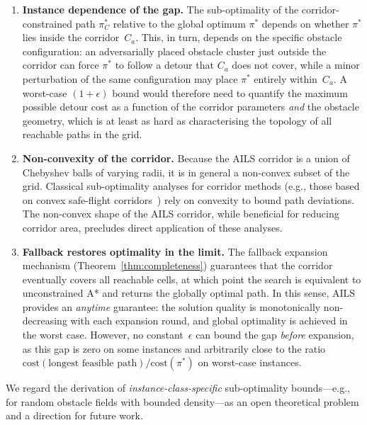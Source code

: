 \documentclass[journal]{IEEEtran}
\begin{document}
\begin{enumerate}
    \item \textbf{Instance dependence of the gap.}
    The sub-optimality of the corridor-constrained path $\pi^{*}_{C}$ relative to the global optimum $\pi^{*}$ depends on whether $\pi^{*}$ lies inside the corridor~$C_a$.
    This, in turn, depends on the specific obstacle configuration: an adversarially placed obstacle cluster just outside the corridor can force $\pi^{*}$ to follow a detour that $C_a$ does not cover, while a minor perturbation of the same configuration may place $\pi^{*}$ entirely within~$C_a$.
    A worst-case $(1{+}\epsilon)$ bound would therefore need to quantify the maximum possible detour cost as a function of the corridor parameters \emph{and} the obstacle geometry, which is at least as hard as characterising the topology of all reachable paths in the grid.

    \item \textbf{Non-convexity of the corridor.}
    Because the AILS corridor is a union of Chebyshev balls of varying radii, it is in general a non-convex subset of the grid.
    Classical sub-optimality analyses for corridor methods (e.g., those based on convex safe-flight corridors~\cite{chen2024bubble}) rely on convexity to bound path deviations.
    The non-convex shape of the AILS corridor, while beneficial for reducing corridor area, precludes direct application of these analyses.

    \item \textbf{Fallback restores optimality in the limit.}
    The fallback expansion mechanism (Theorem~\ref{thm:completeness}) guarantees that the corridor eventually covers all reachable cells, at which point the search is equivalent to unconstrained A* and returns the globally optimal path.
    In this sense, AILS provides an \emph{anytime} guarantee: the solution quality is monotonically non-decreasing with each expansion round, and global optimality is achieved in the worst case.
    However, no constant~$\epsilon$ can bound the gap \emph{before} expansion, as this gap is zero on some instances and arbitrarily close to the ratio $\mathrm{cost}(\text{longest feasible path}) / \mathrm{cost}(\pi^{*})$ on worst-case instances.
\end{enumerate}

\noindent
We regard the derivation of \emph{instance-class-specific} sub-optimality bounds---e.g., for random obstacle fields with bounded density---as an open theoretical problem and a direction for future work.
\end{document}
